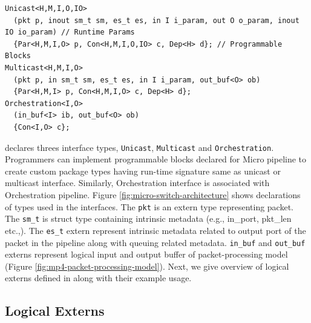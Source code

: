 \documentclass[letterpaper,twocolumn,10pt]{article}
\begin{document}
\begin{lstlisting}[frame=none]
Unicast<H,M,I,O,IO>
  (pkt p, inout sm_t sm, es_t es, in I i_param, out O o_param, inout IO io_param) // Runtime Params
  {Par<H,M,I,O> p, Con<H,M,I,O,IO> c, Dep<H> d}; // Programmable Blocks
Multicast<H,M,I,O>
  (pkt p, in sm_t sm, es_t es, in I i_param, out_buf<O> ob)
  {Par<H,M,I> p, Con<H,M,I,O> c, Dep<H> d}; 
Orchestration<I,O>
  (in_buf<I> ib, out_buf<O> ob)
  {Con<I,O> c};
\end{lstlisting}
\uarch declares threes interface types, \texttt{Unicast}, \texttt{Multicast} and \texttt{Orchestration}.
Programmers can implement programmable blocks declared for Micro pipeline to create custom package types having run-time signature same as unicast or multicast interface.
Similarly, Orchestration interface is associated with Orchestration pipeline.
Figure \ref{fig:micro-switch-architecture} shows declarations of types used in the interfaces.
The \texttt{pkt} is an extern type representing packet. 
The \texttt{sm\_t} is struct type containing intrinsic metadata (e.g., in\_port, pkt\_len etc.,).
The \texttt{es\_t} extern represent intrinsic metadata related to output port of the packet in the pipeline along with queuing related metadata.
\texttt{in\_buf} and \texttt{out\_buf} externs represent logical input and output buffer of \ulang packet-processing model (Figure \ref{fig:mp4-packet-processing-model}).
Next, we give overview of logical externs defined in \uarch along with their example usage.




\subsection{Logical Externs}
\label{sec:externs}
\end{document}
